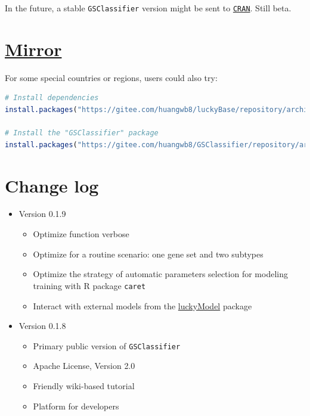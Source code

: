 \documentclass[
  12pt,
]{book}
\newcommand{\passthrough}[1]{#1}
\begin{document}
In the future, a stable \passthrough{\lstinline!GSClassifier!} version might be sent to \href{https://cran.r-project.org/}{\passthrough{\lstinline!CRAN!}}. Still beta.

\hypertarget{mirror}{%
\section*{\texorpdfstring{\href{https://gitee.com/huangwb8/GSClassifier}{Mirror}}{Mirror}}\label{mirror}}

For some special countries or regions, users could also try:

\begin{lstlisting}[language=R]
# Install dependencies
install.packages("https://gitee.com/huangwb8/luckyBase/repository/archive/Primary?format=tar.gz", repos=NULL, method="libcurl")

# Install the "GSClassifier" package
install.packages("https://gitee.com/huangwb8/GSClassifier/repository/archive/Primary?format=tar.gz", repos=NULL, method="libcurl")
\end{lstlisting}

\hypertarget{change-log}{%
\section*{Change log}\label{change-log}}

\begin{itemize}
\item
  Version 0.1.9

  \begin{itemize}
  \item
    Optimize function verbose
  \item
    Optimize for a routine scenario: one gene set and two subtypes
  \item
    Optimize the strategy of automatic parameters selection for modeling training with R package \passthrough{\lstinline!caret!}
  \item
    Interact with external models from the \href{https://github.com/huangwb8/luckyModel}{luckyModel} package
  \end{itemize}
\item
  Version 0.1.8

  \begin{itemize}
  \item
    Primary public version of \passthrough{\lstinline!GSClassifier!}
  \item
    Apache License, Version 2.0
  \item
    Friendly wiki-based tutorial
  \item
    Platform for developers
  \end{itemize}
\end{itemize}
\end{document}
